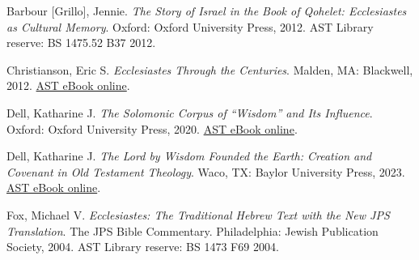 \documentclass[titlepage]{article}
\begin{document}
\begingroup
\renewcommand{\section}[2]{}%
\begin{thebibliography}{Christianson}%


	 Barbour [Grillo], Jennie.
	\emph{The Story of Israel in the Book of Qohelet: Ecclesiastes as Cultural Memory}.
	Oxford: Oxford University Press, 2012. AST Library reserve: BS 1475.52 B37 2012.


	 Christianson, Eric S.
    \emph{Ecclesiastes Through the Centuries}.
    Malden, MA: Blackwell, 2012. \href{https://ast.primo.exlibrisgroup.com/view/action/uresolver.do?operation=resolveService&package_service_id=930405710007188&institutionId=7188&customerId=7185&VE=true}{AST eBook online}.


	 Dell, Katharine J.
	\emph{The Solomonic Corpus of “Wisdom” and Its Influence}.
	Oxford: Oxford University Press, 2020. \href{https://ast.primo.exlibrisgroup.com/view/action/uresolver.do?operation=resolveService&package_service_id=930405680007188&institutionId=7188&customerId=7185&VE=true}{AST eBook online}.

	 Dell, Katharine J.
	\emph{The Lord by Wisdom Founded the Earth: Creation and Covenant in Old Testament Theology}.
	Waco, TX: Baylor University Press, 2023. \href{https://ast.primo.exlibrisgroup.com/view/action/uresolver.do?operation=resolveService&package_service_id=930405660007188&institutionId=7188&customerId=7185&VE=true}{AST eBook online}.

	 Fox, Michael V.
	\emph{Ecclesiastes: The Traditional Hebrew Text with the New JPS Translation}. The JPS Bible Commentary.
	Philadelphia: Jewish Publication Society, 2004. AST Library reserve: BS 1473 F69 2004.


\end{thebibliography}
\end{document}
